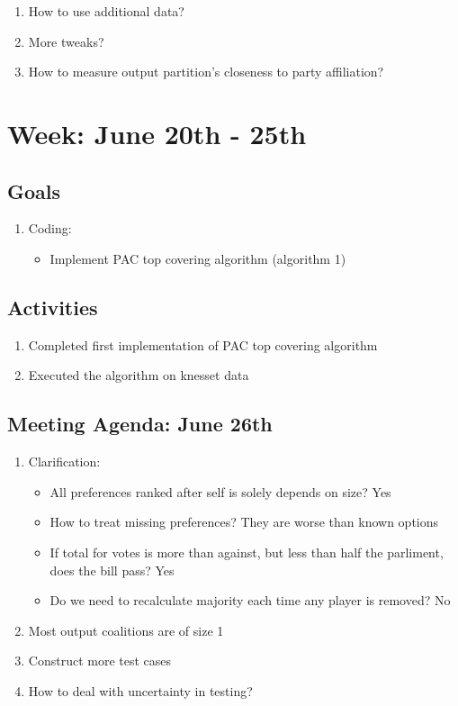 \documentclass[a4paper]{article}
\begin{document}
\begin{enumerate}
  \item How to use additional data?
  \item More tweaks?
  \item How to measure output partition's closeness to party affiliation?
\end{enumerate}

\section*{Week: June 20th - 25th}

\subsection*{Goals}

\begin{enumerate}
  \item Coding:
  \begin{itemize}
    \item Implement PAC top covering algorithm (algorithm 1)
  \end{itemize}
\end{enumerate}

\subsection*{Activities}

\begin{enumerate}
  \item Completed first implementation of PAC top covering algorithm
  \item Executed the algorithm on knesset data
\end{enumerate}

\subsection*{Meeting Agenda: June 26th}

\begin{enumerate}
  \item Clarification:
  \begin{itemize}
    \item All preferences ranked after self is solely depends on size? Yes
    \item How to treat missing preferences? They are worse than known options
    \item If total for votes is more than against, but less than half the parliment, does the bill pass? Yes
    \item Do we need to recalculate majority each time any player is removed? No
  \end{itemize}
  \item Most output coalitions are of size 1
  \item Construct more test cases
  \item How to deal with uncertainty in testing?
\end{enumerate}
\end{document}
